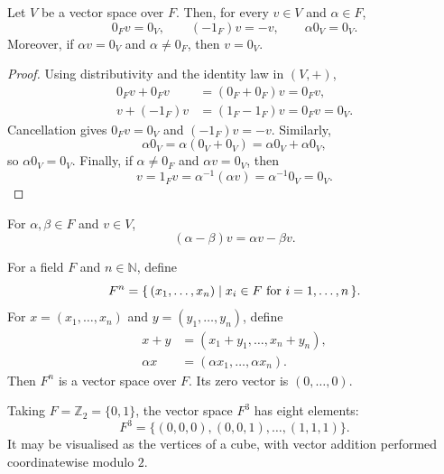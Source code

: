 \begin{Theorem}\label{thm:ZeroScalar}
Let $V$ be a vector space over $F$. Then, for every $v\in V$ and $\alpha\in F$,
\begin{equation*}
0_Fv=0_V,\qquad (-1_F)v=-v,\qquad \alpha 0_V=0_V.
\end{equation*}
Moreover, if $\alpha v=0_V$ and $\alpha\ne0_F$, then $v=0_V$.
\end{Theorem}
\begin{proof}
Using distributivity and the identity law in $(V,+)$,
\begin{align*}
0_Fv+0_Fv&=(0_F+0_F)v=0_Fv,\\
v+(-1_F)v&=(1_F-1_F)v=0_Fv=0_V.
\end{align*}
Cancellation gives $0_Fv=0_V$ and $(-1_F)v=-v$. Similarly,
\begin{equation*}
\alpha0_V=\alpha(0_V+0_V)=\alpha0_V+\alpha0_V,
\end{equation*}
so $\alpha0_V=0_V$. Finally, if $\alpha\ne0_F$ and $\alpha v=0_V$, then
\begin{equation*}
v=1_Fv=\alpha^{-1}(\alpha v)=\alpha^{-1}0_V=0_V.
\end{equation*}
\end{proof}

\begin{Corollary}
For $\alpha,\beta\in F$ and $v\in V$,
\begin{equation*}
(\alpha-\beta)v=\alpha v-\beta v.
\end{equation*}
\end{Corollary}

\begin{Example}\label{ex:TupleSpace}
For a field $F$ and $n\in\mathbb N$, define
\begin{equation*}
F^n=\qty{\, (x_1,\ldots,x_n) \mid x_i\in F\text{ for }i=1,\ldots,n \,}.
\end{equation*}
For $x=(x_1,\ldots,x_n)$ and $y=(y_1,\ldots,y_n)$, define
\begin{align*}
x+y&=(x_1+y_1,\ldots,x_n+y_n),\\
\alpha x&=(\alpha x_1,\ldots,\alpha x_n).
\end{align*}
Then $F^n$ is a vector space over $F$. Its zero vector is $(0,\ldots,0)$.
\end{Example}

\begin{Example}
Taking $F=\mathbb Z_2=\{0,1\}$, the vector space $F^3$ has eight elements:
\begin{equation*}
F^3=\{(0,0,0),(0,0,1),\ldots,(1,1,1)\}.
\end{equation*}
It may be visualised as the vertices of a cube, with vector addition performed coordinatewise modulo $2$.
\end{Example}

